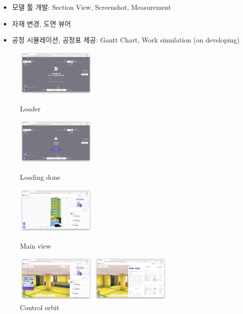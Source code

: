 \begin{itemize}
\begin{itemize}[label=$\star$]
\begin{itemize}
		      \item 모델 툴 개발: Section View, Screenshot, Measurement
		      \item 자재 변경, 도면 뷰어
		      \item 공정 시뮬레이션, 공정표 제공: Gantt Chart, Work simulation (on developing)
	      \end{itemize}
	      \begin{figure}[!ht]
		      \begin{fullwidth}
			      \parbox{0.35\textwidth}{
				      \centering
				      \includegraphics[width=0.35\textwidth]{images/builderhub-curation-loader-1.png}
				      \caption*{Loader}
			      }\qquad
			      \parbox{0.35\textwidth}{
				      \centering
				      \includegraphics[width=0.35\textwidth]{images/builderhub-curation-loader-2.png}
				      \caption*{Loading done}
			      }\qquad
			      \parbox{0.35\textwidth}{
				      \centering
				      \includegraphics[width=0.35\textwidth]{images/builderhub-curation-main.png}
				      \caption*{Main view}
			      }\qquad
			      \parbox{0.35\textwidth}{
				      \centering
				      \includegraphics[width=0.35\textwidth]{images/builderhub-curation-control.png}
				      \caption*{Control orbit}
			      }
			      \parbox{0.35\textwidth}{
				      \centering
				      \includegraphics[width=0.35\textwidth]{images/builderhub-curation-filter.png}
}
\end{fullwidth}
\end{figure}
\end{itemize}
\end{itemize}
